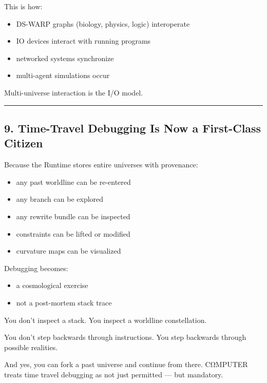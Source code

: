 This is how:

\begin{itemize}
\tightlist
\item
  DS-WARP graphs (biology, physics, logic) interoperate
\item
  IO devices interact with running programs
\item
  networked systems synchronize
\item
  multi-agent simulations occur
\end{itemize}

Multi-universe interaction is the I/O model.

\begin{center}\rule{0.5\linewidth}{0.5pt}\end{center}

\subsection{9. Time-Travel Debugging Is Now a First-Class
Citizen}\label{time-travel-debugging-is-now-a-first-class-citizen}

Because the Runtime stores entire universes with provenance:

\begin{itemize}
\tightlist
\item
  any past worldline can be re-entered
\item
  any branch can be explored
\item
  any rewrite bundle can be inspected
\item
  constraints can be lifted or modified
\item
  curvature maps can be visualized
\end{itemize}

Debugging becomes:

\begin{itemize}
\tightlist
\item
  a cosmological exercise
\item
  not a post-mortem stack trace
\end{itemize}

You don't inspect a stack. You inspect a worldline constellation.

You don't step backwards through instructions. You step backwards
through possible realities.

And yes, you can fork a past universe and continue from there. CΩMPUTER
treats time travel debugging as not just permitted --- but mandatory.

